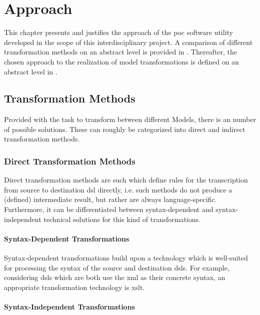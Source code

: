 \chapter{Approach}
\label{chap:approach}

This chapter presents and justifies the approach of the \gls{poc} software utility developed in the scope of this interdisciplinary project. A comparison of different transformation methods on an abstract level is provided in . Thereafter, the chosen approach to the realization of model transformations is defined on an abstract level in .

\section{Transformation Methods}
\label{sec:approach:transform}

Provided with the task to transform between different Models, there is an number of possible solutions. These can roughly be categorized into direct and indirect transformation methods.

\subsection{Direct Transformation Methods}

Direct transformation methods are such which define rules for the transcription from source to destination \gls{dsl} directly, i.e. such methods do not produce a (defined) intermediate result, but rather are always language-specific. Furthermore, it can be differentiated between syntax-dependent and syntax-independent technical solutions for this kind of transformations.

\subsubsection{Syntax-Dependent Transformations}

Syntax-dependent transformations build upon a technology which is well-suited for processing the syntax of the source and destination \glspl{dsl}. For example, considering \glspl{dsl} which are both use the \gls{xml}\cite{ref:xml} as their concrete syntax, an appropriate transformation technology is \gls{xslt}\cite{ref:xslt}.

\subsubsection{Syntax-Independent Transformations}


